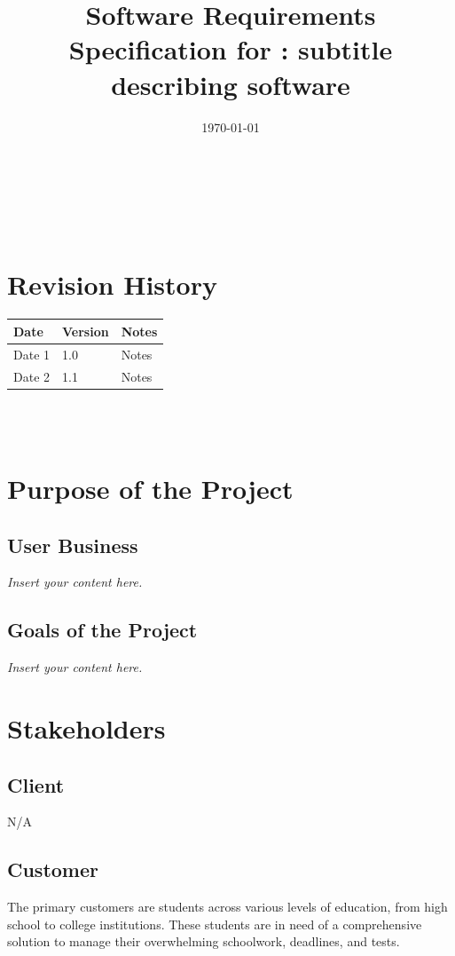 \documentclass[12pt]{article}
\newcommand{\lips}{\textit{Insert your content here.}}
\begin{document}
\title{Software Requirements Specification for \progname: subtitle describing software} 
\author{\authname}
\date{\today}
	
\maketitle
~\newpage


\tableofcontents

~\newpage

\section*{Revision History}

\begin{tabularx}{\textwidth}{p{3cm}p{2cm}X}
\toprule {\textbf{Date}} & {\textbf{Version}} & {\textbf{Notes}}\\
\midrule
Date 1 & 1.0 & Notes\\
Date 2 & 1.1 & Notes\\
\bottomrule
\end{tabularx}

~\\

~\newpage
\section{Purpose of the Project}
\subsection{User Business}
\lips
\subsection{Goals of the Project}
\lips
\section{Stakeholders}
\subsection{Client}
N/A
\subsection{Customer}
The primary customers are students across various levels of education, from high school to college institutions. These students are in need of a comprehensive solution to manage their overwhelming schoolwork, deadlines, and tests.
\end{document}
